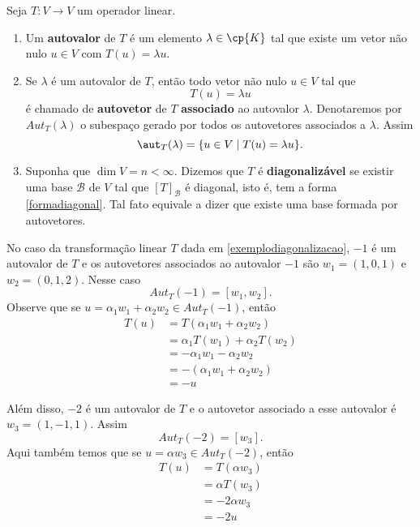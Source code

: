 \begin{definicao}
    Seja $T : V \to V$ um operador linear.
    \begin{enumerate}[label={\roman*})]
        \item Um \textbf{autovalor} de $T$ é um elemento $\lambda \in \cp{K}$ tal que existe um vetor não nulo $u \in V$ com $T(u) = \lambda u$.
        \item Se $\lambda$ é um autovalor de $T$, então todo vetor não nulo $u \in V$ tal que
        \[
            T(u) = \lambda u
        \]
        é chamado de \textbf{autovetor} de $T$ \textbf{associado} ao autovalor $\lambda$. Denotaremos por $Aut_T(\lambda)$ o subespaço gerado por todos os autovetores associados a $\lambda$. Assim
        \[
            \aut_T(\lambda) = \{u \in V \mid T(u) = \lambda u\}.
        \]
        \item Suponha que $\dim V = n < \infty$. Dizemos que $T$ é \textbf{diagonalizável} se existir uma base $\mathcal{B}$ de $V$ tal que $[T]_\mathcal{B}$ é diagonal, isto é, tem a forma \eqref{formadiagonal}. Tal fato equivale a dizer que existe uma base formada por autovetores.
    \end{enumerate}
\end{definicao}

\begin{exemplo}
    No caso da transformação linear $T$ dada em \eqref{exemplodiagonalizacao}, $-1$ é um autovalor de $T$ e os autovetores associados ao autovalor $-1$ são $w_1 = (1, 0, 1)$ e $w_2 = (0, 1, 2)$. Nesse caso
    \[
        Aut_T(-1) = [w_1, w_2].
    \]
    Observe que se $u = \alpha_1w_1 + \alpha_2w_2 \in Aut_T(-1)$, então
    \begin{align*}
        T(u) &= T(\alpha_1w_1 + \alpha_2w_2) \\ &= \alpha_1T(w_1) + \alpha_2T(w_2) \\ &= -\alpha_1w_1 - \alpha_2w_2 \\ &= -(\alpha_1w_1 + \alpha_2w_2) \\ &= -u
    \end{align*}

    Além disso, $-2$ é um autovalor de $T$ e o autovetor associado a esse autovalor é $w_3 = (1, -1, 1)$. Assim
    \[
        Aut_T(-2) = [w_3].
    \]
    Aqui também temos que se $u = \alpha w_3 \in Aut_T(-2)$, então
    \begin{align*}
        T(u) &= T(\alpha w_3) \\ &= \alpha T(w_3) \\ &= -2\alpha w_3 \\ &= -2u
    \end{align*}
\end{exemplo}

